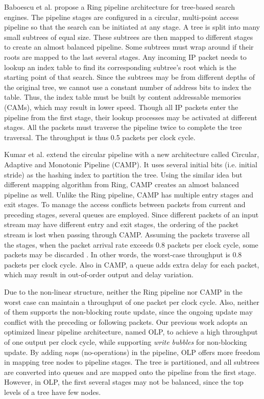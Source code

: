 \documentclass{sigcomm-alternate}
\begin{document}
Baboescu et al. \cite{isca05:baboescu} propose a Ring pipeline architecture for tree-based search engines. The pipeline stages are configured in a circular, multi-point access pipeline so that the search can be initiated at any stage. A tree is split into many small subtrees of equal size. These subtrees are then mapped to different stages to create an almost balanced pipeline. Some subtrees must wrap around if their roots are mapped to the last several stages. Any incoming IP packet needs to lookup an index table to find its corresponding subtree's root which is the starting point of that search. Since the subtrees may be from different depths of the original tree, we cannot use a constant number of address bits to index the table. Thus, the index table must be built by content addressable memories (CAMs), which may result in lower speed. Though all IP packets enter the pipeline from the first stage, their lookup processes may be activated at different stages. All the packets must traverse the pipeline twice to complete the tree traversal. The throughput is thus 0.5 packets per clock cycle.

Kumar et al. \cite{ancs06:kumar} extend the circular pipeline with a new architecture called Circular, Adaptive and Monotonic Pipeline (CAMP). It uses several initial bits (i.e. initial stride) as the hashing index to partition the tree. Using the similar idea but different mapping algorithm from Ring\cite{isca05:baboescu}, CAMP creates an almost balanced pipeline as well. Unlike the Ring pipeline, CAMP has multiple entry stages and exit stages. To manage the access conflicts between packets from current and preceding stages, several queues are employed. Since different packets of an input stream may have different entry and exit stages, the ordering of the packet stream is lost when passing through CAMP. Assuming the packets traverse all the stages, when the packet arrival rate exceeds 0.8 packets per clock cycle, some packets may be discarded \cite{ancs06:kumar}. In other words, the worst-case throughput is 0.8 packets per clock cycle. Also in CAMP, a queue adds extra delay for each packet, which may result in out-of-order output and delay variation.


Due to the non-linear structure, neither the Ring pipeline nor CAMP in the worst case can maintain a throughput of one packet per clock cycle. Also, neither of them supports the non-blocking route update, since the ongoing update may conflict with the preceding or following packets. Our previous work \cite{hoti07:jiang} adopts an optimized linear pipeline architecture, named OLP, to achieve a high throughput of one output per clock cycle, while supporting \textit{write bubbles} \cite{infocom03:basu} for non-blocking update. By adding $nop$s (no-operations) in the pipeline, OLP offers more freedom in mapping tree nodes to pipeline stages. The tree is partitioned, and all subtrees are converted into queues and are mapped onto the pipeline from the first stage. However, in OLP, the first several stages may not be balanced, since the top levels of a tree have few nodes. 
\end{document}
